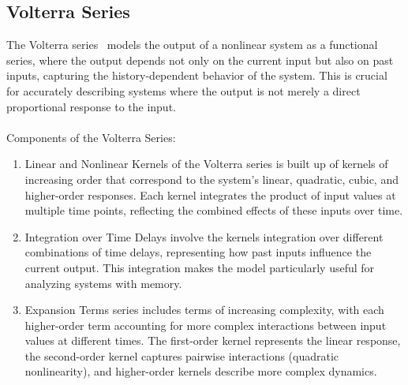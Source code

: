 \documentclass[12pt]{article}
\begin{document}
    \subsection{Volterra Series}
    The Volterra series~\cite{wiener1958} models the output of a nonlinear system as a functional series,
    where the output depends not only on the current input but also on past inputs, capturing
    the history-dependent behavior of the system. This is crucial for accurately describing
    systems where the output is not merely a direct proportional response to the input.\\
    \\
    Components of the Volterra Series:\\
    \begin{enumerate}
    \item Linear and Nonlinear Kernels of the Volterra series is built up of kernels of
    increasing order that correspond to the system's linear, quadratic, cubic, and
    higher-order responses. Each kernel integrates the product of input values at multiple
    time points, reflecting the combined effects of these inputs over time.
    \item Integration over Time Delays involve the kernels integration over different combinations
    of time delays, representing how past inputs influence the current output.
    This integration makes the model particularly useful for analyzing systems with memory.\\
    \item Expansion Terms series includes terms of increasing complexity, with each
    higher-order term accounting for more complex interactions between input values
    at different times. The first-order kernel represents the linear response, the
    second-order kernel captures pairwise interactions (quadratic nonlinearity), and
    higher-order kernels describe more complex dynamics.
    \end{enumerate}
\end{document}
